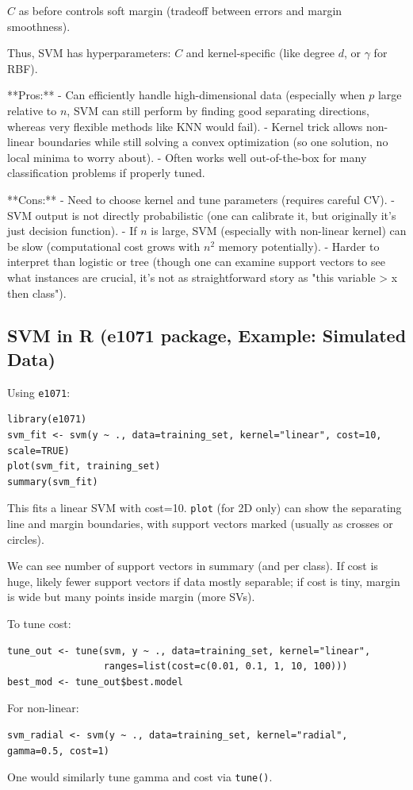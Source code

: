 \documentclass[11pt]{article}
\begin{document}
$C$ as before controls soft margin (tradeoff between errors and margin smoothness).

Thus, SVM has hyperparameters: $C$ and kernel-specific (like degree $d$, or $\gamma$ for RBF).

**Pros:** 
- Can efficiently handle high-dimensional data (especially when $p$ large relative to $n$, SVM can still perform by finding good separating directions, whereas very flexible methods like KNN would fail).
- Kernel trick allows non-linear boundaries while still solving a convex optimization (so one solution, no local minima to worry about).
- Often works well out-of-the-box for many classification problems if properly tuned.

**Cons:** 
- Need to choose kernel and tune parameters (requires careful CV).
- SVM output is not directly probabilistic (one can calibrate it, but originally it's just decision function).
- If $n$ is large, SVM (especially with non-linear kernel) can be slow (computational cost grows with $n^2$ memory potentially).
- Harder to interpret than logistic or tree (though one can examine support vectors to see what instances are crucial, it's not as straightforward story as "this variable > x then class").

\subsection{SVM in R (e1071 package, Example: Simulated Data)}
Using \texttt{e1071}:
\begin{verbatim}
library(e1071)
svm_fit <- svm(y ~ ., data=training_set, kernel="linear", cost=10, scale=TRUE)
plot(svm_fit, training_set)
summary(svm_fit)
\end{verbatim}
This fits a linear SVM with cost=10. \texttt{plot} (for 2D only) can show the separating line and margin boundaries, with support vectors marked (usually as crosses or circles). 

We can see number of support vectors in summary (and per class). If cost is huge, likely fewer support vectors if data mostly separable; if cost is tiny, margin is wide but many points inside margin (more SVs).

To tune cost:
\begin{verbatim}
tune_out <- tune(svm, y ~ ., data=training_set, kernel="linear",
                 ranges=list(cost=c(0.01, 0.1, 1, 10, 100)))
best_mod <- tune_out$best.model
\end{verbatim}
For non-linear:
\begin{verbatim}
svm_radial <- svm(y ~ ., data=training_set, kernel="radial", gamma=0.5, cost=1)
\end{verbatim}
One would similarly tune gamma and cost via \texttt{tune()}.
\end{document}

